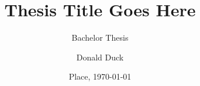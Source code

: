 
\usepackage{sebithesistitle}

\title{Thesis Title Goes Here}
\subtitle{Bachelor Thesis}
\author{Donald Duck}
\date{Place, \today}

\def\documentname{Project	Plan for Bachelor Thesis Project}
\def\studentname{Donald Duck}
\def\snumber{1234567}
\def\course{Informatics - Software Engineering}
\def\period{February 2017 - July 2017}
\def\companyname{company abc}
\def\companyaddress{Some Address}
\def\companypostcodecity{12345, Somewhere}
\def\companycountry{Germany}
\def\companycoach{John Doe}
\def\companycoachmail{john.doe@company.com}
\def\universitytutor{Lecturer A}
\def\universitytutormail{lecturer.a@fontys.nl}
\def\examinator{Professional A}
\def\externalexpert{Professional B}
\def\hasnda{no}


\maketitle



